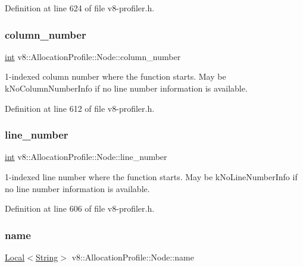 Definition at line 624 of file v8-\/profiler.\+h.

\mbox{\label{structv8_1_1AllocationProfile_1_1Node_a7cf86acc298428c858673fc1f9dbe305}} 
\subsubsection{\texorpdfstring{column\+\_\+number}{column\_number}}
{\footnotesize\ttfamily \mbox{\hyperlink{classint}{int}} v8\+::\+Allocation\+Profile\+::\+Node\+::column\+\_\+number}

1-\/indexed column number where the function starts. May be k\+No\+Column\+Number\+Info if no line number information is available. 

Definition at line 612 of file v8-\/profiler.\+h.

\mbox{\label{structv8_1_1AllocationProfile_1_1Node_ac9773c92a3af3a9a9420337599e68bd9}} 
\subsubsection{\texorpdfstring{line\+\_\+number}{line\_number}}
{\footnotesize\ttfamily \mbox{\hyperlink{classint}{int}} v8\+::\+Allocation\+Profile\+::\+Node\+::line\+\_\+number}

1-\/indexed line number where the function starts. May be k\+No\+Line\+Number\+Info if no line number information is available. 

Definition at line 606 of file v8-\/profiler.\+h.

\mbox{\label{structv8_1_1AllocationProfile_1_1Node_af9f2c323d6a11e836c02e8ac88adc5a8}} 
\subsubsection{\texorpdfstring{name}{name}}
{\footnotesize\ttfamily \mbox{\hyperlink{classv8_1_1Local}{Local}}$<$\mbox{\hyperlink{classv8_1_1String}{String}}$>$ v8\+::\+Allocation\+Profile\+::\+Node\+::name}

